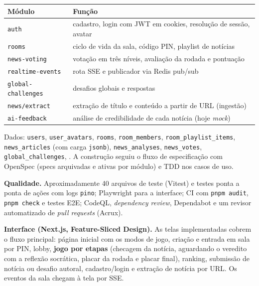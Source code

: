 \documentclass[
  brazilian,
  11pt,
]{article}
\newcounter{none} %
\begin{document}
{\def\LTcaptype{none} %
\begin{longtable}[]{@{}
  >{\raggedright\arraybackslash}p{}
  >{\raggedright\arraybackslash}p{}@{}}
\toprule\noalign{}
\begin{minipage}[b]{\linewidth}\raggedright
Módulo
\end{minipage} & \begin{minipage}[b]{\linewidth}\raggedright
Função
\end{minipage} \\
\midrule\noalign{}
\endhead
\bottomrule\noalign{}
\endlastfoot
\texttt{auth} & cadastro, login com JWT em cookies, resolução de sessão, avatar \\
\texttt{rooms} & ciclo de vida da sala, código PIN, playlist de notícias \\
\texttt{news-voting} & votação em três níveis, avaliação da rodada e pontuação \\
\texttt{realtime-events} & rota SSE e publicador via Redis pub/sub \\
\texttt{global-challenges} & desafios globais e respostas \\
\texttt{news/extract} & extração de título e conteúdo a partir de URL (ingestão) \\
\texttt{ai-feedback} & análise de credibilidade de cada notícia (hoje \emph{mock}) \\
\end{longtable}
}

Dados: \texttt{users}, \texttt{user\_avatars}, \texttt{rooms}, \texttt{room\_members}, \texttt{room\_playlist\_items}, \texttt{news\_articles} (com carga \texttt{jsonb}), \texttt{news\_analyses}, \texttt{news\_votes}, \texttt{global\_challenges}, . A construção seguiu o fluxo de especificação com OpenSpec (specs arquivadas e ativas por módulo) e TDD nos casos de uso.

\textbf{Qualidade.} Aproximadamente 40 arquivos de teste (Vitest) e testes ponta a ponta de ações com logs \texttt{pino}; Playwright para a interface; CI com \texttt{pnpm\ audit}, \texttt{pnpm\ check} e testes E2E; CodeQL, \emph{dependency review}, Dependabot e um revisor automatizado de \emph{pull requests} (Acrux).

\textbf{Interface (Next.js, Feature-Sliced Design).} As telas implementadas cobrem o fluxo principal: página inicial com os modos de jogo, criação e entrada em sala por PIN, lobby, \textbf{jogo por etapas} (checagem da notícia, aguardando o veredito com a reflexão socrática, placar da rodada e placar final), ranking, submissão de notícia ou desafio autoral, cadastro/login e extração de notícia por URL. Os eventos da sala chegam à tela por SSE.
\end{document}
